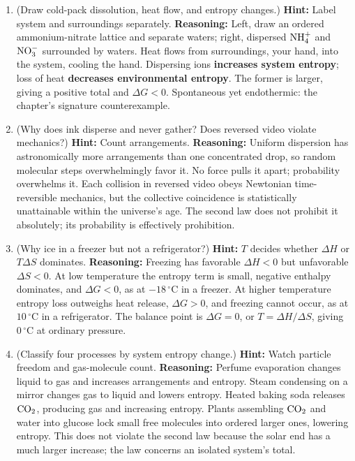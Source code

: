 \begin{enumerate}[itemsep=3pt]
\item (Draw cold-pack dissolution, heat flow, and entropy changes.) \textbf{Hint:} Label system and surroundings separately. \textbf{Reasoning:} Left, draw an ordered ammonium-nitrate lattice and separate waters; right, dispersed $\mathrm{NH_4^+}$ and $\mathrm{NO_3^-}$ surrounded by waters. Heat flows from surroundings, your hand, into the system, cooling the hand. Dispersing ions \textbf{increases system entropy}; loss of heat \textbf{decreases environmental entropy}. The former is larger, giving a positive total and $\Delta G<0$. Spontaneous yet endothermic: the chapter's signature counterexample.
\item (Why does ink disperse and never gather? Does reversed video violate mechanics?) \textbf{Hint:} Count arrangements. \textbf{Reasoning:} Uniform dispersion has astronomically more arrangements than one concentrated drop, so random molecular steps overwhelmingly favor it. No force pulls it apart; probability overwhelms it. Each collision in reversed video obeys Newtonian time-reversible mechanics, but the collective coincidence is statistically unattainable within the universe's age. The second law does not prohibit it absolutely; its probability is effectively prohibition.
\item (Why ice in a freezer but not a refrigerator?) \textbf{Hint:} $T$ decides whether $\Delta H$ or $T\Delta S$ dominates. \textbf{Reasoning:} Freezing has favorable $\Delta H<0$ but unfavorable $\Delta S<0$. At low temperature the entropy term is small, negative enthalpy dominates, and $\Delta G<0$, as at $-18\,^{\circ}\mathrm{C}$ in a freezer. At higher temperature entropy loss outweighs heat release, $\Delta G>0$, and freezing cannot occur, as at $10\,^{\circ}\mathrm{C}$ in a refrigerator. The balance point is $\Delta G = 0$, or $T = \Delta H / \Delta S$, giving $0\,^{\circ}\mathrm{C}$ at ordinary pressure.
\item (Classify four processes by system entropy change.) \textbf{Hint:} Watch particle freedom and gas-molecule count. \textbf{Reasoning:} Perfume evaporation changes liquid to gas and increases arrangements and entropy. Steam condensing on a mirror changes gas to liquid and lowers entropy. Heated baking soda releases $\mathrm{CO_2}$, producing gas and increasing entropy. Plants assembling $\mathrm{CO_2}$ and water into glucose lock small free molecules into ordered larger ones, lowering entropy. This does not violate the second law because the solar end has a much larger increase; the law concerns an isolated system's total.

\end{enumerate}
